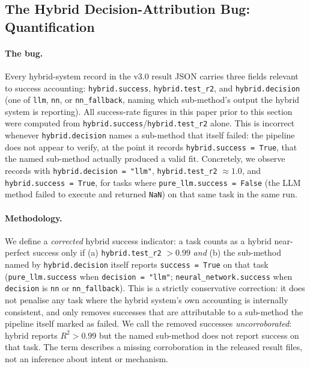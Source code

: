 \documentclass[twoside,11pt]{article}
\newcommand{\Rsq}{R^{2}}
\begin{document}
\subsection{The Hybrid Decision-Attribution Bug: Quantification}
\label{sec:hybrid-attribution-bug}

\paragraph{The bug.} Every hybrid-system record in the v3.0 result JSON carries
three fields relevant to success accounting: \texttt{hybrid.success},
\texttt{hybrid.test\_r2}, and \texttt{hybrid.decision} (one of \texttt{llm},
\texttt{nn}, or \texttt{nn\_fallback}, naming which sub-method's output the
hybrid system is reporting). All success-rate figures in this paper prior to
this section were computed from \texttt{hybrid.success}/\texttt{hybrid.test\_r2}
alone. This is incorrect whenever \texttt{hybrid.decision} names a sub-method
that itself failed: the pipeline does not appear to verify, at the point it
records \texttt{hybrid.success = True}, that the named sub-method actually
produced a valid fit. Concretely, we observe records with
\texttt{hybrid.decision = "llm"}, \texttt{hybrid.test\_r2} $\approx 1.0$, and
\texttt{hybrid.success = True}, for tasks where \texttt{pure\_llm.success =
False} (the LLM method failed to execute and returned \texttt{NaN}) on that
same task in the same run.

\paragraph{Methodology.} We define a \emph{corrected} hybrid success indicator:
a task counts as a hybrid near-perfect success only if (a)
\texttt{hybrid.test\_r2} $> 0.99$ \emph{and} (b) the sub-method named by
\texttt{hybrid.decision} itself reports \texttt{success = True} on that task
(\texttt{pure\_llm.success} when \texttt{decision = "llm"};
\texttt{neural\_network.success} when \texttt{decision} is \texttt{nn} or
\texttt{nn\_fallback}). This is a strictly conservative correction: it does
not penalise any task where the hybrid system's own accounting is internally
consistent, and only removes successes that are attributable to a sub-method
the pipeline itself marked as failed.
We call the removed successes \emph{uncorroborated}: hybrid reports $\Rsq>0.99$ but the named sub-method does not report success on that task. The term describes a missing corroboration in the released result files, not an inference about intent or mechanism.
\end{document}
